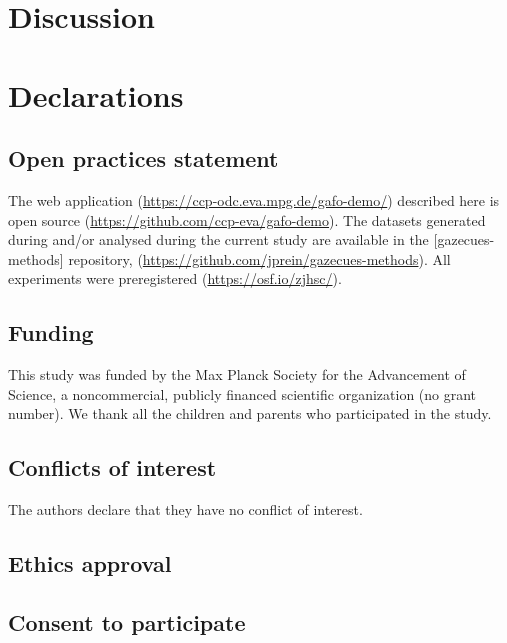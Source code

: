 \documentclass[
  english,
  man,floatsintext]{apa6}
\begin{document}
\hypertarget{discussion}{%
\section{Discussion}\label{discussion}}

\hypertarget{declarations}{%
\section{Declarations}\label{declarations}}

\hypertarget{open-practices-statement}{%
\subsection{Open practices statement}\label{open-practices-statement}}

The web application (\url{https://ccp-odc.eva.mpg.de/gafo-demo/}) described here is open source (\url{https://github.com/ccp-eva/gafo-demo}).
The datasets generated during and/or analysed during the current study are available
in the {[}gazecues-methods{]} repository, (\url{https://github.com/jprein/gazecues-methods}).
All experiments were preregistered (\url{https://osf.io/zjhsc/}).

\hypertarget{funding}{%
\subsection{Funding}\label{funding}}

This study was funded by the Max Planck Society for the Advancement of Science, a noncommercial, publicly financed scientific organization (no grant number).
We thank all the children and parents who participated in the study.

\hypertarget{conflicts-of-interest}{%
\subsection{Conflicts of interest}\label{conflicts-of-interest}}

The authors declare that they have no conflict of interest.

\hypertarget{ethics-approval}{%
\subsection{Ethics approval}\label{ethics-approval}}

\hypertarget{consent-to-participate}{%
\subsection{Consent to participate}\label{consent-to-participate}}
\end{document}
